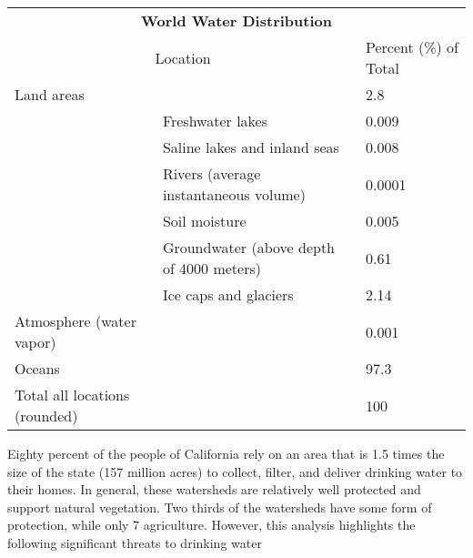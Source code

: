 \documentclass{article}
\begin{document}
\begin{table}[]
\begin{tabular}{lll}
\multicolumn{3}{c}{{\color[HTML]{3166FF} \textbf{World Water Distribution}}}                                            \\
\multicolumn{2}{c}{{\color[HTML]{FD6864} Location}}                      & {\color[HTML]{FE996B} Percent (\%) of Total} \\
Land areas                    &                                          & 2.8                                          \\
                              & Freshwater lakes                         & 0.009                                        \\
                              & Saline lakes and inland seas             & 0.008                                        \\
                              & Rivers (average instantaneous volume)    & 0.0001                                       \\
                              & Soil moisture                            & 0.005                                        \\
                              & Groundwater (above depth of 4000 meters) & 0.61                                         \\
                              & Ice caps and glaciers                    & 2.14                                         \\
Atmosphere (water vapor)      &                                          & 0.001                                        \\
Oceans                        &                                          & 97.3                                         \\
Total all locations (rounded) &                                          & 100                                         
\end{tabular}
\end{table}
Eighty percent of the people of California rely on an area that is 1.5 times the size of the state
(157 million acres) to collect, filter, and deliver drinking water to their homes. In general, these
watersheds are relatively well protected and support natural vegetation. Two thirds of the
watersheds have some form of protection, while only 7%
agriculture. However, this analysis highlights the following significant threats to drinking water
\end{document}
